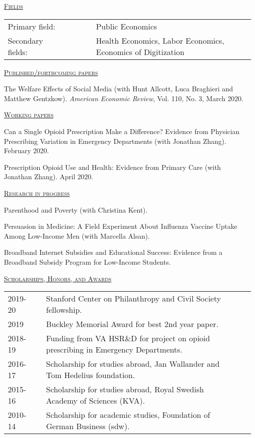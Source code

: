 \documentclass[letterpaper,11pt]{article}
\begin{document}
\underline {\textsc{Fields}}

\noindent\begin{tabular}{@{}l@{}lll@{}cl}
Primary field: &&&&& Public Economics \\
Secondary fields: &&&&& Health Economics, Labor Economics, Economics of Digitization
\end{tabular}


\bigskip
 
 
 \underline {\textsc{Published/forthcoming papers}}
 
The Welfare Effects of Social Media (with Hunt Allcott, Luca Braghieri and Matthew Gentzkow). \textit{American Economic Review}, Vol. 110, No. 3, March 2020.

\medskip

\underline {\textsc{Working papers}}

Can a Single Opioid Prescription Make a Difference? Evidence from Physician Prescribing Variation in Emergency Departments (with Jonathan Zhang). February 2020.

Prescription Opioid Use and Health: Evidence from Primary Care (with Jonathan Zhang). April 2020.


\medskip


\underline {\textsc{Research in progress}}

Parenthood and Poverty (with Christina Kent).

Persuasion in Medicine: A Field Experiment About Influenza Vaccine Uptake Among Low-Income Men (with Marcella Alsan).

Broadband Internet Subsidies and Educational Success: Evidence from a Broadband Subsidy Program for Low-Income Students.



\newpage
 
\underline {\textsc{Scholarships, Honors, and Awards}}

\begin{tabular}{@{}l@{}cl@{}cl}
2019-20 & & Stanford Center on Philanthropy and Civil Society fellowship. \\
2019 & & Buckley Memorial Award for best 2nd year paper. \\
2018-19 & & Funding from VA HSR\&D for project on opioid prescribing in Emergency Departments. \\
2016-17 & & Scholarship for studies abroad, Jan Wallander and Tom Hedelius foundation. \\
2015-16 & & Scholarship for studies abroad, Royal Swedish Academy of Sciences (KVA).  \\
2010-14 & & Scholarship for academic studies, Foundation of German Business (sdw).
\end{tabular}
 
\end{document}
